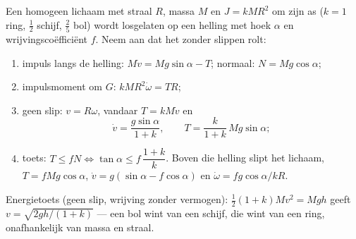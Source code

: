 \begin{method}\label{met:b2:rigid-body-mechanics:incline}
Een homogeen lichaam met straal $R$, massa $M$ en 
$J =
kMR^2$ om zijn as ($k = 1$ ring, $\tfrac12$ schijf, $\tfrac25$ bol)
wordt
losgelaten op een helling met hoek $\alpha$ en wrijvingscoëfficiënt $f$.
Neem aan dat het zonder slippen rolt:
\begin{enumerate}
  \item impuls langs de helling: $M\dot v = Mg\sin\alpha - T$; normaal:
        $N = Mg\cos\alpha$;
  \item impulsmoment om $G$: $kMR^2\dot\omega = TR$;
  \item geen slip: $v = R\omega$, vandaar $T = kM\dot v$ en
        \[
        \dot v = \frac{g\sin\alpha}{1 + k} , \qquad T = \frac{k}{1 + k}\,
        Mg\sin\alpha ;
        \]
  \item toets: $T \le fN \iff \tan\alpha \le f\,\dfrac{1 + k}{k}$.
        Boven die helling slipt het lichaam, $T = fMg\cos\alpha$,
        $\dot v =
        g(\sin\alpha - f\cos\alpha)$ en
        $\dot\omega = fg\cos\alpha/kR$.
\end{enumerate}
Energietoets (geen slip, wrijving zonder vermogen):
$\tfrac12(1 + k)Mv^2 =
Mgh$ geeft $v = \sqrt{2gh/(1 + k)}$ --- een bol wint
van een schijf, die
wint van een ring, onafhankelijk van massa en straal.
\end{method}

